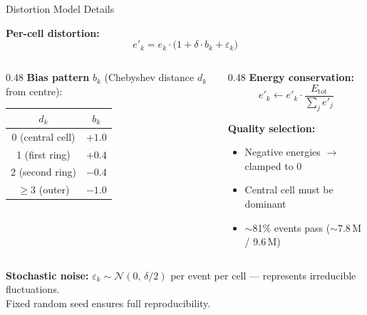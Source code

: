 \documentclass[aspectratio=169,10pt]{beamer}
\begin{document}
\begin{frame}[noframenumbering]{Distortion Model Details}

\textbf{Per-cell distortion:}
\[
  e'_k = e_k \cdot \bigl(1 + \delta\cdot b_k + \varepsilon_k\bigr)
\]

\begin{columns}[T]
\begin{column}{0.48\textwidth}
  \textbf{Bias pattern} $b_k$ (Chebyshev distance $d_k$ from centre):
  \vspace{4pt}

  \begin{tabular}{cc}
    \toprule
    $d_k$ & $b_k$ \\
    \midrule
    0 (central cell) & $+1.0$ \\
    1 (first ring)   & $+0.4$ \\
    2 (second ring)  & $-0.4$ \\
    $\geq 3$ (outer) & $-1.0$ \\
    \bottomrule
  \end{tabular}
\end{column}
\begin{column}{0.48\textwidth}
  \textbf{Energy conservation:}
  \[
    e'_k \leftarrow e'_k \cdot
    \frac{E_\text{tot}}{\sum_j e'_j}
  \]

  \textbf{Quality selection:}
  \begin{itemize}
    \item Negative energies $\to$ clamped to 0
    \item Central cell must be dominant
    \item $\sim$81\% events pass ($\sim$7.8\,M / 9.6\,M)
  \end{itemize}
\end{column}
\end{columns}

\vspace{8pt}
\textbf{Stochastic noise:} $\varepsilon_k \sim \mathcal{N}(0,\,\delta/2)$
per event per cell — represents irreducible fluctuations.\\
Fixed random seed ensures full reproducibility.
\end{frame}
\end{document}
